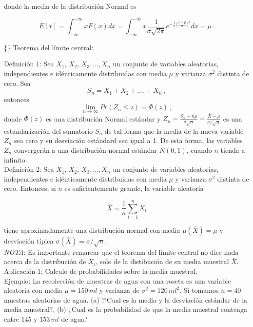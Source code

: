 \documentclass[
]{agujournal2019}
\begin{document}
donde la media de la distribución Normal es

\[E[x]=\int^{-\infty}_{-\infty} x F(x) dx=\int^{-\infty}_{-\infty} x \frac{1}{\sigma \sqrt{2\pi}}e^{-\frac{1}{2} \big( \frac{x-\mu}{\sigma} \big)^2 } dx=\mu\,.\]

\vspace{0.5cm}

\{\noindent\} Teorema del límite central:

Definición 1: Sea \(X_1,\,X_2,\,X_3,...,X_n\) un conjunto de variables
aleatorias, independientes e idénticamente distribuidas con media
\(\mu\) y varianza \(\sigma^2\) distinta de cero. Sea
\[S_n=X_1+X_2+....+X_n\,,\] entonces
\[\lim_{n \to\infty} Pr (Z_n\le z)= \Phi(z)\,,\] donde \(\Phi(z)\) es
una distribución Normal estándar y
\(Z_n=\frac{S_n - n\mu} {\sigma\sqrt{n}} = \frac{\bar{X} - \mu} {\sigma/\sqrt{n}}\)
es una estandarización del sumatorio \(S_n\) de tal forma que la media
de la nueva variable \(Z_n\) sea cero y su desviación estándard sea
igual a 1. De esta forma, las variables \(Z_n\) convergerán a una
distribución normal estándar \(N(0,1)\), cuando \(n\) tienda a
infinito.\\

Definición 2: Sea \(X_1,\,X_2,\,X_3,...,X_n\) un conjunto de variables
aleatorias, independientes e idénticamente distribuidas con media
\(\mu\) y varianza \(\sigma^2\) distinta de cero. Entonces, si \(n\) es
suficientemente grande, la variable aleatoria

\[\bar{X}=\frac{1}{n}\sum^n_{i=1}{X_i}\]

tiene aproximadamente una distribución normal con media
\(\mu(\bar{X})=\mu\) y desviación típica
\(\sigma(\bar{X})=\sigma/\sqrt{n}\).\\

\emph{NOTA}: Es importante remarcar que el teorema del límite central no
dice nada acerca de la distribución de \(X_i\), solo de la distibución
de su media muestral \(\bar{X}\).\\

Aplicación 1: Calculo de probabilidades sobre la media muestral.\\

Ejemplo: La recolección de muestras de agua con una roseta es una
variable aleatoria con media \(\mu=150\,{ ml}\) y varianza de
\(\sigma^2=120\,{ ml}^2\). Si tomamos \(n=40\) muestras aleatorias de
agua. (a) ?{}`Cual es la media y la desviación estándar de la media
muestral?, (b) ¿Cual es la probabilidad de que la media muestral
contenga entre \(145\) y \(153\,{ ml}\) de agua?\\
\end{document}
